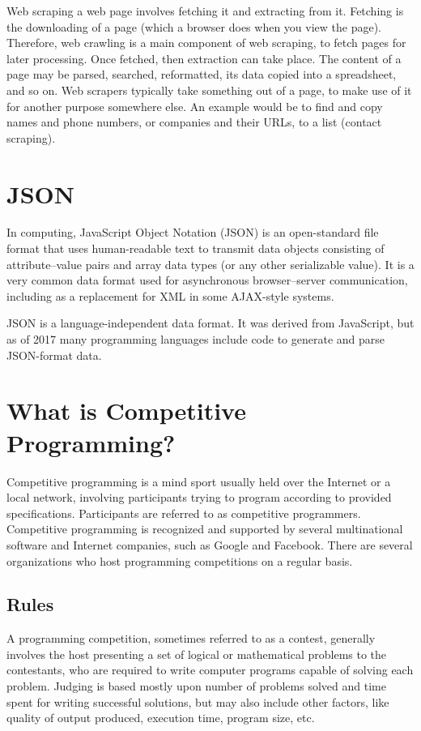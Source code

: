 \documentclass[12pt,a4paper]{report}
\begin{document}
Web scraping a web page involves fetching it and extracting from it. Fetching is the downloading of a page (which a browser does when you view the page). Therefore, web crawling is a main component of web scraping, to fetch pages for later processing. Once fetched, then extraction can take place. The content of a page may be parsed, searched, reformatted, its data copied into a spreadsheet, and so on. Web scrapers typically take something out of a page, to make use of it for another purpose somewhere else. An example would be to find and copy names and phone numbers, or companies and their URLs, to a list (contact scraping).

\section{JSON}
In computing, JavaScript Object Notation (JSON) is an open-standard file format that uses human-readable text to transmit data objects consisting of attribute–value pairs and array data types (or any other serializable value). It is a very common data format used for asynchronous browser–server communication, including as a replacement for XML in some AJAX-style systems.

JSON is a language-independent data format. It was derived from JavaScript, but as of 2017 many programming languages include code to generate and parse JSON-format data. 

\section{What is Competitive Programming?}
Competitive programming is a mind sport usually held over the Internet or a local network, involving participants trying to program according to provided specifications. Participants are referred to as competitive programmers. Competitive programming is recognized and supported by several multinational software and Internet companies, such as Google and Facebook. There are several organizations who host programming competitions on a regular basis.

\subsection{Rules}
A programming competition, sometimes referred to as a contest, generally involves the host presenting a set of logical or mathematical problems to the contestants, who are required to write computer programs capable of solving each problem. Judging is based mostly upon number of problems solved and time spent for writing successful solutions, but may also include other factors, like quality of output produced, execution time, program size, etc.
\end{document}

